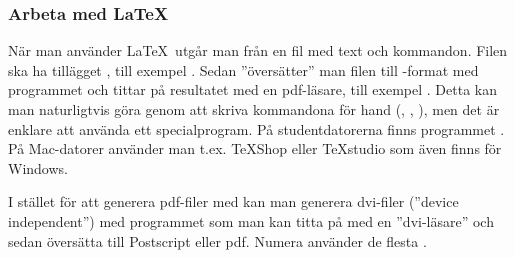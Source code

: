\begin{frame}[fragile=singleslide]
\frametitle{Arbeta med \LaTeX}
När man använder \LaTeX\ utgår man från en fil med text och kommandon. Filen ska ha tillägget , till exempel . Sedan ''översätter'' man filen till -format med programmet  och tittar på resultatet med en pdf-läsare, till exempel . Detta kan man naturligtvis göra genom att skriva kommandona för hand (, , ), men det är enklare att använda ett specialprogram. På studentdatorerna finns programmet . På Mac-datorer använder man t.ex. TeXShop eller TeXstudio som även finns för Windows.

\pindent I stället för att generera pdf-filer med  kan man generera dvi-filer (''device independent'') med programmet  som man kan titta på med en ''dvi-läsare'' och sedan översätta till Postscript eller pdf. Numera använder de flesta .
\end{frame} 


